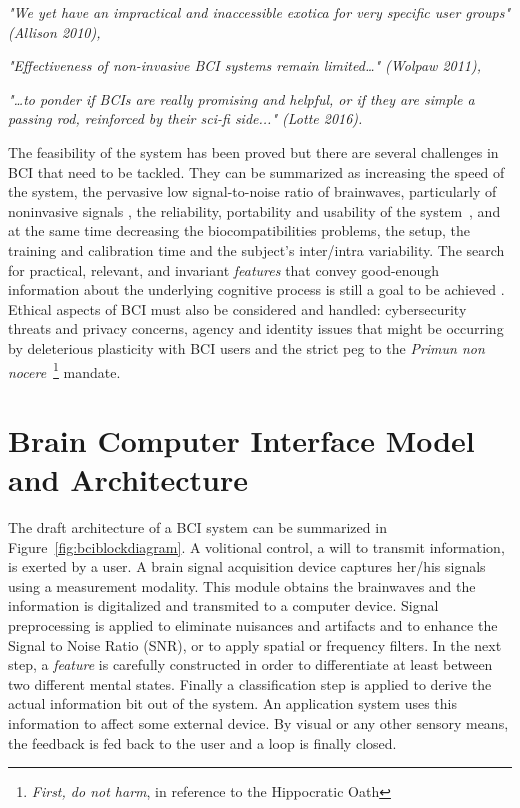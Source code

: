 \vspace{3px}

\textit{"We yet have an impractical and inaccessible exotica for very specific user groups" (Allison 2010),}

\vspace{3px}

\textit{"Effectiveness of non-invasive BCI systems remain limited…" (Wolpaw 2011),}

\vspace{3px}

\textit{"…to ponder if BCIs are really promising and helpful, or if they are simple a passing rod, reinforced by their sci-fi side..." (Lotte 2016).}

\vspace{3px}

The feasibility of the system has been proved but there are several challenges in BCI that need to be tackled. They can be summarized as 
increasing the speed of the system, the pervasive low signal-to-noise ratio of brainwaves, particularly of noninvasive signals \cite{Lotte2018}, the reliability, portability and usability of the system~\cite{Wang2018}, and at the same time decreasing the biocompatibilities problems, the setup, the training and calibration time and the subject's inter/intra variability. The search for practical, relevant, and invariant \textit{features} that convey good-enough information about the underlying cognitive process is still a goal to be achieved \cite{Perdikis2014}.  Ethical aspects of BCI \cite{Yuste2017} must also be considered and handled: cybersecurity threats and privacy concerns,  agency and identity issues that might be occurring by deleterious plasticity with BCI users and the strict peg to the \textit{Primun non nocere}~\footnote{\textit{First, do not harm}, in reference to the Hippocratic Oath} mandate.

\section{Brain Computer Interface Model and Architecture}

The draft architecture of a BCI system can be summarized in Figure~\ref{fig:bciblockdiagram}.  A volitional control, a will to transmit information, is exerted by a user. A brain signal acquisition device captures her/his signals using a measurement modality.  This module obtains the brainwaves and the information is digitalized and transmited to a computer device.  Signal preprocessing is applied to eliminate nuisances and artifacts and to enhance the Signal to Noise Ratio (SNR), or to apply spatial or frequency filters.  In the next step, a \textit{feature} is carefully constructed in order to differentiate at least between two different mental states.  Finally a classification step is applied to derive the actual information bit out of the system.   An application system uses this information to affect some external device.  By visual or any other sensory means, the feedback is fed back to the user and a loop is finally closed.


